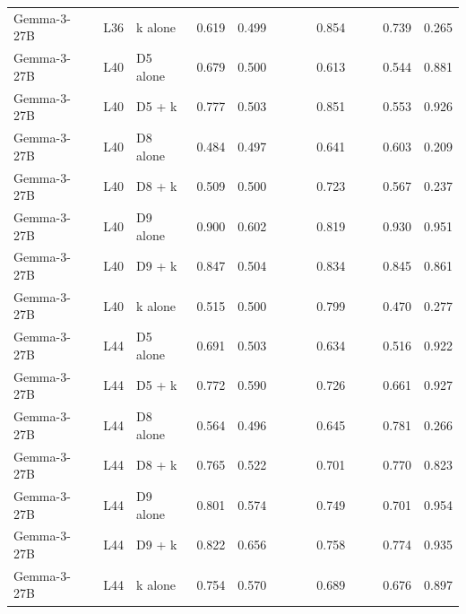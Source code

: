 \begin{table}
\begin{tabular}{lllrrrrrrrrrr}
Gemma-3-27B & L36 & k alone & 0.619 & 0.499 &  &  &  & 0.854 &  &  & 0.739 & 0.265 \\
Gemma-3-27B & L40 & D5 alone & 0.679 & 0.500 &  &  &  & 0.613 &  &  & 0.544 & 0.881 \\
Gemma-3-27B & L40 & D5 + k & 0.777 & 0.503 &  &  &  & 0.851 &  &  & 0.553 & 0.926 \\
Gemma-3-27B & L40 & D8 alone & 0.484 & 0.497 &  &  &  & 0.641 &  &  & 0.603 & 0.209 \\
Gemma-3-27B & L40 & D8 + k & 0.509 & 0.500 &  &  &  & 0.723 &  &  & 0.567 & 0.237 \\
Gemma-3-27B & L40 & D9 alone & 0.900 & 0.602 &  &  &  & 0.819 &  &  & 0.930 & 0.951 \\
Gemma-3-27B & L40 & D9 + k & 0.847 & 0.504 &  &  &  & 0.834 &  &  & 0.845 & 0.861 \\
Gemma-3-27B & L40 & k alone & 0.515 & 0.500 &  &  &  & 0.799 &  &  & 0.470 & 0.277 \\
Gemma-3-27B & L44 & D5 alone & 0.691 & 0.503 &  &  &  & 0.634 &  &  & 0.516 & 0.922 \\
Gemma-3-27B & L44 & D5 + k & 0.772 & 0.590 &  &  &  & 0.726 &  &  & 0.661 & 0.927 \\
Gemma-3-27B & L44 & D8 alone & 0.564 & 0.496 &  &  &  & 0.645 &  &  & 0.781 & 0.266 \\
Gemma-3-27B & L44 & D8 + k & 0.765 & 0.522 &  &  &  & 0.701 &  &  & 0.770 & 0.823 \\
Gemma-3-27B & L44 & D9 alone & 0.801 & 0.574 &  &  &  & 0.749 &  &  & 0.701 & 0.954 \\
Gemma-3-27B & L44 & D9 + k & 0.822 & 0.656 &  &  &  & 0.758 &  &  & 0.774 & 0.935 \\
Gemma-3-27B & L44 & k alone & 0.754 & 0.570 &  &  &  & 0.689 &  &  & 0.676 & 0.897 \\
\bottomrule
\end{tabular}
\end{table}
